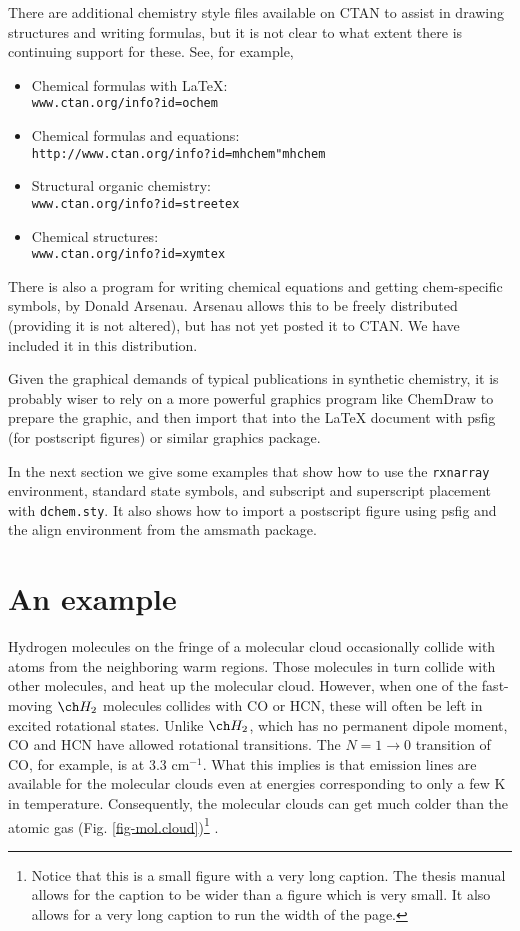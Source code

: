 There are additional chemistry style files available on CTAN to assist
in drawing structures and writing formulas, but it is not clear to what
extent there is continuing support for these.  See, for example,
\begin{itemize}
\item Chemical formulas with \LaTeX:\\
\verb+www.ctan.org/info?id=ochem+
\item Chemical formulas and equations:\\
\verb+http://www.ctan.org/info?id=mhchem"mhchem+
\item Structural organic chemistry:\\
\verb+www.ctan.org/info?id=streetex+
\item Chemical structures:\\
\verb+www.ctan.org/info?id=xymtex+
\end{itemize}

There is also a program for  writing chemical equations and getting
chem-specific symbols,  by Donald Arsenau.  
Arsenau allows this to be freely distributed (providing it is not altered), 
but has not yet posted it to CTAN.  
We have included it in  this distribution. 

Given the graphical demands of typical publications in synthetic chemistry,
it is probably wiser to rely on a more powerful graphics program like 
ChemDraw to prepare the graphic, and then import that into the
LaTeX document with psfig (for postscript figures) or similar graphics 
package.
  
In the next section  we give some examples that show how to use the
{\tt  rxnarray } 
environment, standard state symbols, and subscript and superscript placement 
with {\tt dchem.sty}.  It also shows how to  import a postscript
figure using psfig and the align environment from the amsmath package.  

\section{An example}
\label{s:chem}
Hydrogen molecules on the fringe of a molecular cloud occasionally
collide with atoms from the neighboring warm regions.  Those molecules in
turn collide with other molecules, and heat up the molecular cloud.
However, when one of the fast-moving $\ch H_2$ molecules collides with
CO or HCN, these will often be left in excited rotational states.
Unlike $\ch H_2$, which has no permanent dipole moment, CO and HCN have
allowed rotational transitions.  The $N = 1\rightarrow 0$ transition
of CO, for example, is at 3.3 cm$^{-1}$.  What this implies is that
emission lines are available for the molecular clouds even at
energies corresponding to only a few K in temperature.  Consequently,
the molecular clouds can get much colder than the atomic gas
(Fig. \ref{fig-mol.cloud})\footnote{Notice that this is a small figure
  with a very  long caption.  The thesis manual allows for the caption to be
 wider than a figure which is very small.  It also
 allows for a very long  caption to run the width of the page.}
.

